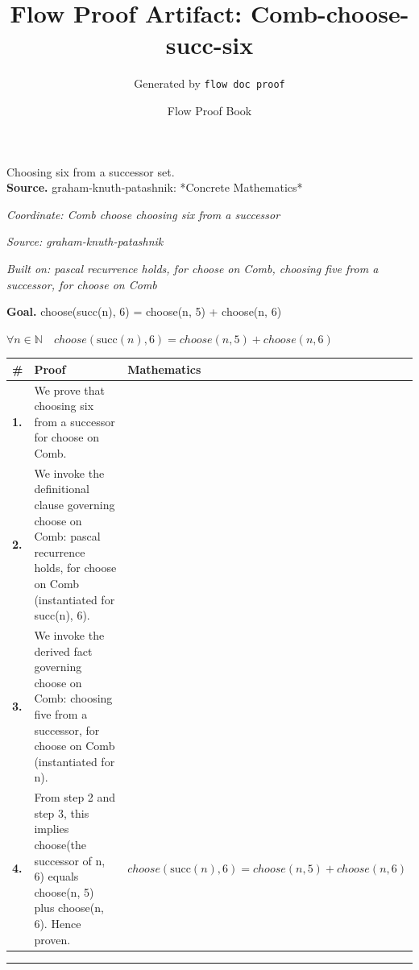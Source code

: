 \documentclass[11pt]{article}
\title{Flow Proof Artifact: Comb-choose-succ-six}
\author{Generated by \texttt{flow doc proof}}
\date{Flow Proof Book}
\theoremstyle{definition}
\begin{document}
\maketitle
Choosing six from a successor set.\\[0.5em]
\textbf{Source.} graham-knuth-patashnik: *Concrete Mathematics*\\[0.5em]
\bigskip
{}\par
\smallskip\noindent\textit{Coordinate: Comb \cdot choose \cdot choosing six from a successor}\par
\smallskip\noindent\textit{Source: graham-knuth-patashnik}\par
\smallskip\noindent\textit{Built on: pascal recurrence holds, for choose on Comb, choosing five from a successor, for choose on Comb}\par
\medskip
\noindent\textbf{Goal.} choose(succ(n), 6) = choose(n, 5) + choose(n, 6)\par
\noindent$\displaystyle \forall n \in \mathbb{N}\quad choose(\mathrm{succ}(n), 6) = choose(n, 5) + choose(n, 6)$\par
\medskip
\noindent
\begin{tabular}{@{} >{\raggedright\arraybackslash}p{} >{\raggedright\arraybackslash}p{} >{\raggedleft\arraybackslash}p{} @{}}
\textbf{\#} & \textbf{Proof} & \textbf{Mathematics} \\
\midrule
\textbf{1.} & We prove that choosing six from a successor for choose on Comb. & \\[0.45em]
\textbf{2.} & We invoke the definitional clause governing choose on Comb: pascal recurrence holds, for choose on Comb (instantiated for succ(n), 6). & \\[0.45em]
\textbf{3.} & We invoke the derived fact governing choose on Comb: choosing five from a successor, for choose on Comb (instantiated for n). & \\[0.45em]
\textbf{4.} & From step 2 and step 3, this implies choose(the successor of n, 6) equals choose(n, 5) plus choose(n, 6). Hence proven. & $\displaystyle choose(\mathrm{succ}(n), 6) = choose(n, 5) + choose(n, 6)$ \\[0.45em]
\bottomrule
\end{tabular}
\label{thm:Comb-choose-choosing_six_from_a_successor}
\par\medskip\hrule
\end{document}
